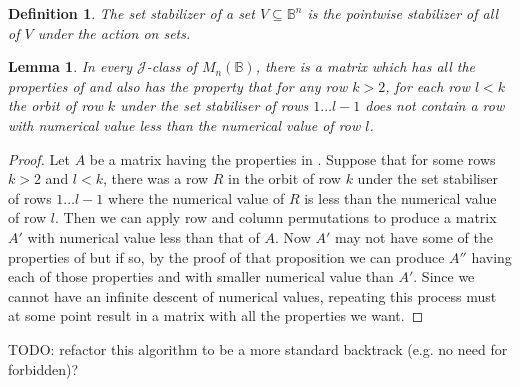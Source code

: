\documentclass[11pt]{article}
\newtheorem{lemma}[thm]{Lemma}
\newtheorem{defi}[thm]{Definition}
\numberwithin{equation}{section}
\newcommand{\B}{\mathbb{B}}
\newcommand{\Bn}{M_n(\B)}
\newcommand{\J}{\mathscr{J}}
\begin{document}
\begin{defi}
  The \emph{set stabilizer} of a set $V \subseteq \B^n$ is the pointwise
  stabilizer of all of $V$ under the action on sets. 
\end{defi}

\begin{lemma}
  In every $\J$-class of $\Bn$, there is a matrix which has all the properties of  and also has the property that for any row $k > 2$, for each row $l < k$ the orbit of row $k$ under the set stabiliser of rows $1 \dots l - 1$ does not contain a row with numerical value less than the numerical value of row $l$.
\end{lemma}

\begin{proof}
  Let $A$ be a matrix having the properties in . Suppose that for some rows $k > 2$ and $l < k$, there was a row $R$ in the orbit of row $k$ under the set stabiliser of rows $1 \dots l - 1$ where the numerical value of $R$ is less than the numerical value of row $l$. Then we can apply row and column permutations to produce a matrix $A'$ with numerical value less than that of $A$. Now $A'$ may not have some of the properties of
   but if so, by the proof of that proposition we can produce $A''$ having each of those properties and with smaller numerical value than $A'$. Since we cannot have an infinite descent of numerical values, repeating this process must at some point result in a matrix with all the properties we want.
\end{proof}

TODO: refactor this algorithm to be a more standard backtrack (e.g. no need for
forbidden)?
\end{document}
